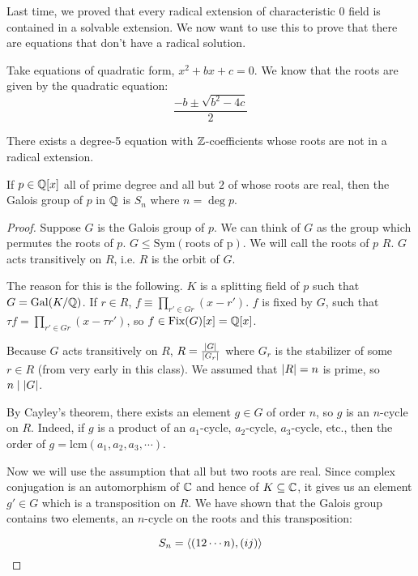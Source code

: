 \documentclass[a4paper,twoside,master.tex]{subfiles}
\begin{document}

Last time, we proved that every radical extension of characteristic $ 0 $ field is contained in a solvable extension. We now want to use this to prove that there are equations that don't have a radical solution.

Take equations of quadratic form, $ x^2 + b x + c = 0 $. We know that the roots are given by the quadratic equation:
\begin{equation}
    \frac{-b \pm \sqrt{b^2 - 4c}}{2}
\end{equation}

\begin{theorem}
    There exists a degree-5 equation with $ \mathbb{Z} $-coefficients whose roots are not in a radical extension.
\end{theorem}

\begin{lemma}
    If $ p \in \mathbb{Q}[x] $ all of prime degree and all but $ 2 $ of whose roots are real, then the Galois group of $ p $ in $ \mathbb{Q} $ is $ S_n $ where $ n = \deg p $.
\end{lemma}
\begin{proof}
    Suppose $ G $ is the Galois group of $ p $. We can think of $ G $ as the group which permutes the roots of $ p $. $ G \leq \text{Sym}(\text{roots of p}) $. We will call the roots of $ p $ $ R $. $ G $ acts transitively on $ R $, i.e. $ R $ is the orbit of $ G $.

    The reason for this is the following. $ K $ is a splitting field of $ p $ such that $ G = \text{Gal}(K/\mathbb{Q}) $. If $ r \in R $, $ f \equiv \prod_{r' \in Gr}(x - r') $. $ f $ is fixed by $ G $, such that $ \tau f = \prod_{r' \in Gr}(x - \tau r') $, so $ f \in \text{Fix}(G)[x] = \mathbb{Q}[x] $.

    Because $ G $ acts transitively on $ R $, $ R = \frac{\abs{G}}{\abs{G_r}} $ where $ G_r $ is the stabilizer of some $ r \in R $ (from very early in this class). We assumed that $ \abs{R} = n $ is prime, so $ n \mid \abs{G} $.

    By Cayley's theorem, there exists an element $ g \in G $ of order $ n $, so $ g $ is an $ n $-cycle on $ R $. Indeed, if $ g $ is a product of an $ a_1 $-cycle, $ a_2 $-cycle, $ a_3 $-cycle, etc., then the order of $ g = \text{lcm}(a_1, a_2, a_3, \cdots) $.

    Now we will use the assumption that all but two roots are real. Since complex conjugation is an automorphism of $ \mathbb{C} $ and hence of $ K \subseteq \mathbb{C} $, it gives us an element $ g' \in G $ which is a transposition on $ R $. We have shown that the Galois group contains two elements, an $ n $-cycle on the roots and this transposition:

    \begin{equation}
        S_n = \ev{(12\cdots n),(ij)}
    \end{equation}
\end{proof}
\end{document}
